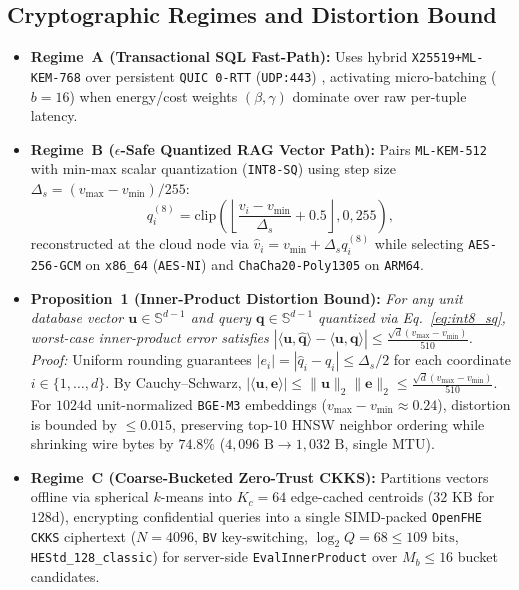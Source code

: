\documentclass[10pt,journal,compsoc]{IEEEtran}
\begin{document}
\subsection{Cryptographic Regimes and Distortion Bound}
\begin{itemize}
    \item \textbf{Regime~A (Transactional SQL Fast-Path):} Uses hybrid \texttt{X25519+\allowbreak ML-KEM-768} over persistent \texttt{QUIC 0-RTT} (\texttt{UDP:443}) \cite{iyengar2021rfc9000}, activating micro-batching ($b=16$) when energy/cost weights $(\beta,\gamma)$ dominate over raw per-tuple latency.
    \item \textbf{Regime~B ($\epsilon$-Safe Quantized RAG Vector Path):} Pairs \texttt{ML-KEM-512} with min-max scalar quantization (\texttt{INT8-SQ}) using step size $\Delta_s = (v_{\max}-v_{\min})/255$:
    \begin{equation}
    q_i^{(8)} = \text{clip}\!\left(\left\lfloor \frac{v_i - v_{\min}}{\Delta_s} + 0.5 \right\rfloor, 0, 255\right),
    \label{eq:int8_sq}
    \end{equation}
    reconstructed at the cloud node via $\hat{v}_i = v_{\min} + \Delta_s q_i^{(8)}$ while selecting \texttt{AES-256-GCM} on \texttt{x86\_64} (\texttt{AES-NI}) and \texttt{ChaCha20-\allowbreak Poly1305} on \texttt{ARM64}.
    \item \textbf{Proposition~1 (Inner-Product Distortion Bound):} \emph{For any unit database vector $\mathbf{u} \in \mathbb{S}^{d-1}$ and query $\mathbf{q} \in \mathbb{S}^{d-1}$ quantized via Eq.~\eqref{eq:int8_sq}, worst-case inner-product error satisfies $|\langle \mathbf{u}, \hat{\mathbf{q}} \rangle - \langle \mathbf{u}, \mathbf{q} \rangle| \le \frac{\sqrt{d}(v_{\max}-v_{\min})}{510}$.} \emph{Proof:} Uniform rounding guarantees $|e_i| = |\hat{q}_i - q_i| \le \Delta_s / 2$ for each coordinate $i \in \{1,\dots,d\}$. By Cauchy--Schwarz, $|\langle \mathbf{u}, \mathbf{e} \rangle| \le \|\mathbf{u}\|_2 \|\mathbf{e}\|_2 \le \frac{\sqrt{d}(v_{\max}-v_{\min})}{510}$. For $1024\text{d}$ unit-normalized \texttt{BGE-M3} embeddings ($v_{\max}-v_{\min} \approx 0.24$), distortion is bounded by $\le 0.015$, preserving top-$10$ HNSW neighbor ordering while shrinking wire bytes by $74.8\%$ ($4{,}096\text{ B} \rightarrow 1{,}032\text{ B}$, single MTU).
    \item \textbf{Regime~C (Coarse-Bucketed Zero-Trust CKKS):} Partitions vectors offline via spherical $k$-means into $K_c = 64$ edge-cached centroids ($32\text{ KB}$ for $128\text{d}$), encrypting confidential queries into a single SIMD-packed \texttt{OpenFHE CKKS} ciphertext ($N = 4096$, \texttt{BV} key-switching, $\log_2 Q = 68 \le 109\text{ bits}$, \texttt{HEStd\_128\_classic}) for server-side \texttt{EvalInnerProduct} over $M_b \le 16$ bucket candidates.
\end{itemize}
\end{document}
